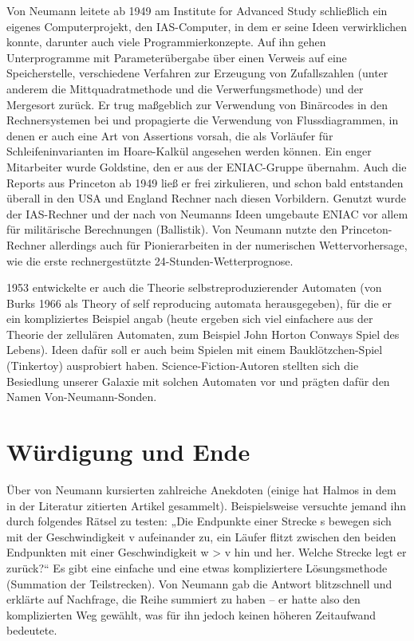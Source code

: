 Von Neumann leitete ab 1949 am Institute for Advanced Study schließlich ein eigenes Computerprojekt, den IAS-Computer, in dem er seine Ideen verwirklichen konnte, darunter auch viele Programmierkonzepte. Auf ihn gehen Unterprogramme mit Parameterübergabe über einen Verweis auf eine Speicherstelle, verschiedene Verfahren zur Erzeugung von Zufallszahlen (unter anderem die Mittquadratmethode und die Verwerfungsmethode) und der Mergesort zurück. Er trug maßgeblich zur Verwendung von Binärcodes in den Rechnersystemen bei und propagierte die Verwendung von Flussdiagrammen, in denen er auch eine Art von Assertions vorsah, die als Vorläufer für Schleifeninvarianten im Hoare-Kalkül angesehen werden können. Ein enger Mitarbeiter wurde Goldstine, den er aus der ENIAC-Gruppe übernahm. Auch die Reports aus Princeton ab 1949 ließ er frei zirkulieren, und schon bald entstanden überall in den USA und England Rechner nach diesen Vorbildern. Genutzt wurde der IAS-Rechner und der nach von Neumanns Ideen umgebaute ENIAC vor allem für militärische Berechnungen (Ballistik). Von Neumann nutzte den Princeton-Rechner allerdings auch für Pionierarbeiten in der numerischen Wettervorhersage, wie die erste rechnergestützte 24-Stunden-Wetterprognose.

1953 entwickelte er auch die Theorie selbstreproduzierender Automaten (von Burks 1966 als Theory of self reproducing automata herausgegeben), für die er ein kompliziertes Beispiel angab (heute ergeben sich viel einfachere aus der Theorie der zellulären Automaten, zum Beispiel John Horton Conways Spiel des Lebens). Ideen dafür soll er auch beim Spielen mit einem Bauklötzchen-Spiel (Tinkertoy) ausprobiert haben. Science-Fiction-Autoren stellten sich die Besiedlung unserer Galaxie mit solchen Automaten vor und prägten dafür den Namen Von-Neumann-Sonden.

\section{Würdigung und Ende}

Über von Neumann kursierten zahlreiche Anekdoten (einige hat Halmos in dem in der Literatur zitierten Artikel gesammelt). Beispielsweise versuchte jemand ihn durch folgendes Rätsel zu testen: „Die Endpunkte einer Strecke s bewegen sich mit der Geschwindigkeit v aufeinander zu, ein Läufer flitzt zwischen den beiden Endpunkten mit einer Geschwindigkeit w > v hin und her. Welche Strecke legt er zurück?“ Es gibt eine einfache und eine etwas kompliziertere Lösungsmethode (Summation der Teilstrecken). Von Neumann gab die Antwort blitzschnell und erklärte auf Nachfrage, die Reihe summiert zu haben – er hatte also den komplizierten Weg gewählt, was für ihn jedoch keinen höheren Zeitaufwand bedeutete.

